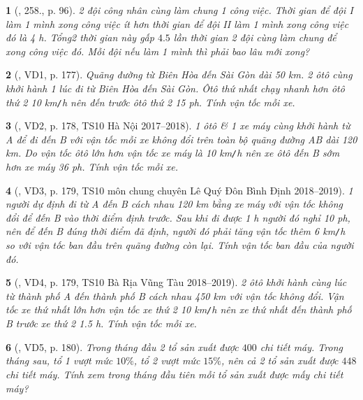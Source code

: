 \documentclass{article}
\newtheorem{baitoan}{}
\begin{document}
\begin{baitoan}[\cite{Tuyen_Toan_9_old}, 258., p. 96]
	2 đội công nhân cùng làm chung 1 công việc. Thời gian để đội I làm 1 mình xong công việc ít hơn thời gian để đội II làm 1 mình xong công việc đó là {\rm4 h}. Tổng2 thời gian này gấp $4.5$ lần thời gian 2 đội cùng làm chung để xong công việc đó. Mỗi đội nếu làm 1 mình thì phải bao lâu mới xong?
\end{baitoan}

\begin{baitoan}[\cite{Thu_Viet_Minh_ptb2}, VD1, p. 177]
	Quãng đường từ Biên Hòa đến Sài Gòn dài {\rm50 km}. 2 ôtô cùng khởi hành 1 lúc đi từ Biên Hòa đến Sài Gòn. Ôtô thứ nhất chạy nhanh hơn ôtô thứ 2 {\rm10 km{\tt/}h} nên đến trước ôtô thứ 2 {\rm15 ph}. Tính vận tốc mỗi xe.
\end{baitoan}

\begin{baitoan}[\cite{Thu_Viet_Minh_ptb2}, VD2, p. 178, TS10 Hà Nội 2017--2018]
	1 ôtô \& 1 xe máy cùng khởi hành từ A để đi đến B với vận tốc mỗi xe không đổi trên toàn bộ quãng đường AB dài {\rm120 km}. Do vận tốc ôtô lớn hơn vận tốc xe máy là {\rm10 km{\tt/}h} nên xe ôtô đến B sớm hơn xe máy {\rm36 ph}. Tính vận tốc mỗi xe.
\end{baitoan}

\begin{baitoan}[\cite{Thu_Viet_Minh_ptb2}, VD3, p. 179, TS10 môn chung chuyên Lê Quý Đôn Bình Định 2018--2019]
	1 người dự định đi từ A đến B cách nhau {\rm120 km} bằng xe máy với vận tốc không đổi để đến B vào thời điểm định trước. Sau khi đi được {\rm1 h} người đó nghỉ {\rm10 ph}, nên để đến B đúng thời điểm đã định, người đó phải tăng vận tốc thêm {\rm6 km{\tt/}h} so với vận tốc ban đầu trên quãng đường còn lại. Tính vận tốc ban đầu của người đó.
\end{baitoan}

\begin{baitoan}[\cite{Thu_Viet_Minh_ptb2}, VD4, p. 179, TS10 Bà Rịa Vũng Tàu 2018--2019]
	2 ôtô khởi hành cùng lúc từ thành phố A đến thành phố B cách nhau {\rm450 km} với vận tốc không đổi. Vận tốc xe thứ nhất lớn hơn vận tốc xe thứ 2 {\rm10 km{\tt/}h} nên xe thứ nhất đến thành phố B trước xe thứ 2 {\rm1.5 h}. Tính vận tốc mỗi xe.
\end{baitoan}

\begin{baitoan}[\cite{Thu_Viet_Minh_ptb2}, VD5, p. 180]
	Trong tháng đầu 2 tổ sản xuất được $400$ chi tiết máy. Trong tháng sau, tổ 1 vượt mức $10\%$, tổ 2 vượt mức $15\%$, nên cả 2 tổ sản xuất được $448$ chi tiết máy. Tính xem trong tháng đầu tiên mỗi tổ sản xuất được mấy chi tiết máy?
\end{baitoan}
\end{document}
